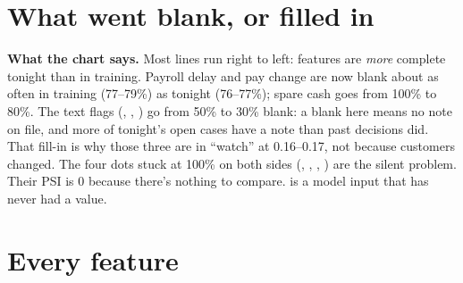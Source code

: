 \documentclass[11pt]{article}
\begin{document}
\section{What went blank, or filled in}


\textbf{What the chart says.} Most lines run right to left: features are \emph{more} complete tonight than in training. Payroll
delay and pay change are now blank about as often in training (77–79\%) as tonight (76–77\%); spare cash goes from 100\% to 80\%. The text flags (, ,
) go from 50\% to 30\% blank: a blank here means no note on file, and more of tonight's open cases have a note than past
decisions did. That fill-in is
why those three are in ``watch'' at 0.16–0.17, not because customers changed. The four dots stuck at 100\% on both sides
(, , , ) are the silent
problem. Their PSI is 0 because there's nothing to compare.  is a model input that has never had a value.

\section{Every feature}
\end{document}
